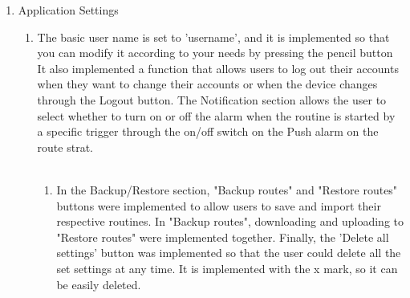 \begin{enumerate}[label=\arabic*.]
    \item {\large{Application Settings}}
          \begin{enumerate}[label*={\arabic*.},ref=\theenumi.\arabic*]
              \setlength{\itemindent}{0.5cm}
                \item
            The basic user name is set to 'username', and it is implemented so that you can modify it according to your needs by pressing the pencil button It also implemented a function that allows users to log out their accounts when they want to change their accounts or when the device changes through the Logout button. The Notification section allows the user to select whether to turn on or off the alarm when the routine is started by a specific trigger through the on/off switch on the Push alarm on the route strat. \\\\  

          \begin{enumerate}[label*={\arabic*.},ref=\theenumi.\arabic*]
              \setlength{\itemindent}{0.5cm}
              \item
            In the Backup/Restore section, "Backup routes" and "Restore routes" buttons were implemented to allow users to save and import their respective routines. In "Backup routes", downloading and uploading to "Restore routes" were implemented together. Finally, the 'Delete all settings' button was implemented so that the user could delete all the set settings at any time. It is implemented with the x mark, so it can be easily deleted. \\\\
          \end{enumerate}
\end{enumerate}
\end{enumerate}